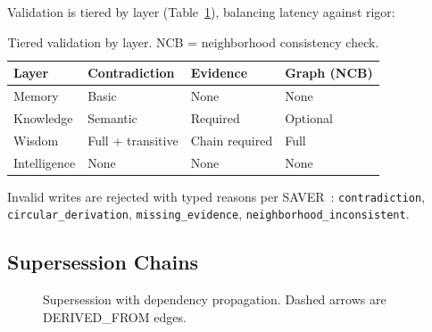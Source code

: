 \documentclass[11pt,letterpaper]{article}
\begin{document}
Validation is tiered by layer (Table~\ref{tab:validation}), balancing latency against rigor:

\begin{table}[H]
\centering
\caption{Tiered validation by layer. NCB = neighborhood consistency check.}
\label{tab:validation}
\begin{tabular}{@{}llll@{}}
\toprule
\textbf{Layer} & \textbf{Contradiction} & \textbf{Evidence} & \textbf{Graph (NCB)} \\
\midrule
Memory & Basic & None & None \\
Knowledge & Semantic & Required & Optional \\
Wisdom & Full + transitive & Chain required & Full \\
Intelligence & None & None & None \\
\bottomrule
\end{tabular}
\end{table}

Invalid writes are rejected with typed reasons per SAVER~\cite{yuan2026saver}: \texttt{contradiction}, \texttt{circular\_derivation}, \texttt{missing\_evidence}, \texttt{neighborhood\_inconsistent}.

\subsection{Supersession Chains}

\begin{figure}[H]
\centering
{}
\caption{Supersession with dependency propagation. Dashed arrows are \textsf{DERIVED\_FROM} edges.}
\label{fig:supersession}
\end{figure}
\end{document}

